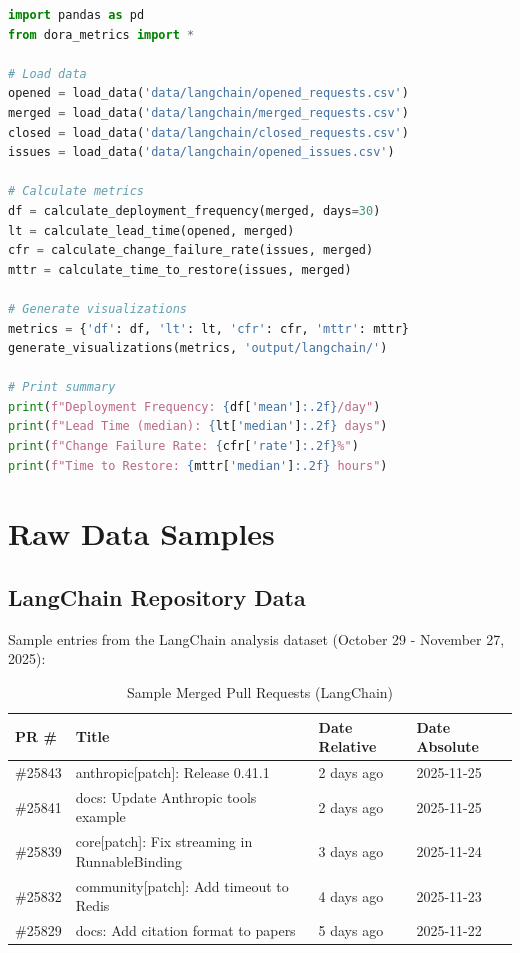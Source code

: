 \begin{lstlisting}[language=Python, caption=Running DORA Metrics Analysis]
import pandas as pd
from dora_metrics import *

# Load data
opened = load_data('data/langchain/opened_requests.csv')
merged = load_data('data/langchain/merged_requests.csv')
closed = load_data('data/langchain/closed_requests.csv')
issues = load_data('data/langchain/opened_issues.csv')

# Calculate metrics
df = calculate_deployment_frequency(merged, days=30)
lt = calculate_lead_time(opened, merged)
cfr = calculate_change_failure_rate(issues, merged)
mttr = calculate_time_to_restore(issues, merged)

# Generate visualizations
metrics = {'df': df, 'lt': lt, 'cfr': cfr, 'mttr': mttr}
generate_visualizations(metrics, 'output/langchain/')

# Print summary
print(f"Deployment Frequency: {df['mean']:.2f}/day")
print(f"Lead Time (median): {lt['median']:.2f} days")
print(f"Change Failure Rate: {cfr['rate']:.2f}%")
print(f"Time to Restore: {mttr['median']:.2f} hours")
\end{lstlisting}

\section{Raw Data Samples}

\subsection{LangChain Repository Data}

Sample entries from the LangChain analysis dataset (October 29 - November 27, 2025):

\begin{table}[H]
\centering
\caption{Sample Merged Pull Requests (LangChain)}
\label{tab:langchain-sample-prs}
\small
\begin{tabular}{@{}llll@{}}
\toprule
\textbf{PR \#} & \textbf{Title} & \textbf{Date Relative} & \textbf{Date Absolute} \\ \midrule
\#25843 & anthropic[patch]: Release 0.41.1 & 2 days ago & 2025-11-25 \\
\#25841 & docs: Update Anthropic tools example & 2 days ago & 2025-11-25 \\
\#25839 & core[patch]: Fix streaming in RunnableBinding & 3 days ago & 2025-11-24 \\
\#25832 & community[patch]: Add timeout to Redis & 4 days ago & 2025-11-23 \\
\#25829 & docs: Add citation format to papers & 5 days ago & 2025-11-22 \\ \bottomrule
\end{tabular}
\end{table}

